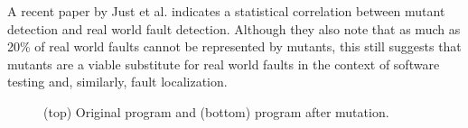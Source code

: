A recent paper by Just et al. \cite{mutants} indicates a statistical
correlation between mutant detection and real world fault detection.
Although they also note that as much as 20\% of real world faults cannot
be represented by mutants, this still suggests that mutants are a viable
substitute for real world faults in the context of software testing and,
similarly, fault localization.

\begin{figure}[tbp]
  \centering
  
  
  \caption{(top) Original program and (bottom) program after mutation.}
  \label{majorex}
\end{figure}